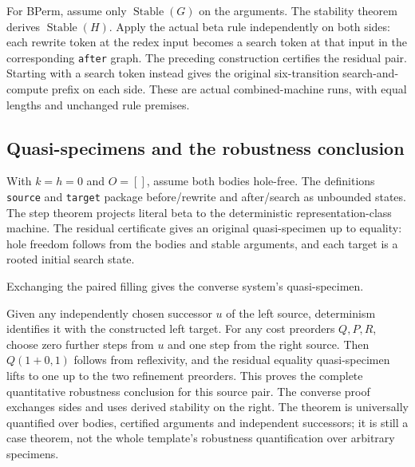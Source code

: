 
For BPerm, assume only $\operatorname{Stable}(G)$ on the arguments. The
stability theorem derives $\operatorname{Stable}(H)$. Apply the actual beta
rule independently on both sides: each rewrite token at the redex input
becomes a search token at that input in the corresponding \texttt{after}
graph. The preceding construction certifies the residual pair. Starting with
a search token instead gives the original six-transition search-and-compute
prefix on each side. These are actual combined-machine runs, with equal
lengths and unchanged rule premises.


\subsection{Quasi-specimens and the robustness conclusion}
With $k=h=0$ and $O=[]$, assume both bodies hole-free. The definitions
\texttt{source} and \texttt{target} package before/rewrite and after/search
as unbounded states. The step theorem projects literal beta to the deterministic
representation-class machine. The residual certificate gives an original
quasi-specimen up to equality: hole freedom follows from the bodies and stable
arguments, and each target is a rooted initial search state.

Exchanging the paired filling gives the converse system's quasi-specimen.


Given any independently chosen successor $u$ of the left source, determinism
identifies it with the constructed left target. For any cost preorders
$Q,P,R$, choose zero further steps from $u$ and one step from the right source.
Then $Q(1+0,1)$ follows from reflexivity, and the residual equality
quasi-specimen lifts to one up to the two refinement preorders. This proves
the complete quantitative robustness conclusion for this source pair.
The converse proof exchanges sides and uses derived stability on the right.
The theorem is universally quantified over bodies, certified arguments and
independent successors; it is still a case theorem, not the whole template's
robustness quantification over arbitrary specimens.

